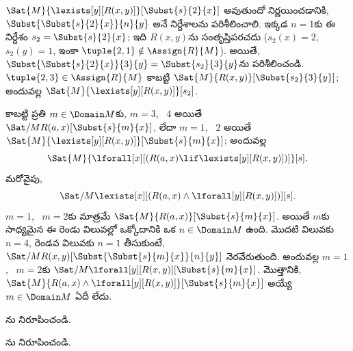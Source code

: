 \documentclass[../../../include/open-logic-section]{subfiles}
\begin{document}
\begin{ex}
$\Sat{M}{\lexists[y][R(x,y)]}[\Subst{s}{2}{x}]$ అవుతుందో
నిర్ణయించడానికి, $\Subst{\Subst{s}{2}{x}}{n}{y}$ అనే 
నిర్దేశాలను పరిశీలించాలి. ఇక్కడ $n = 1$కు ఈ నిర్దేశం
$s_2 = \Subst{s}{2}{x}$; ఇది $R(x,y)$ను సంతృప్తిపరచదు ($s_2(x) = 2$,
$s_2(y) = 1$, ఇంకా $\tuple{2,1}\notin \Assign{R}{M}$). అయితే,
$\Subst{\Subst{s}{2}{x}}{3}{y} = \Subst{s_2}{3}{y}$ను పరిశీలించండి.
$\tuple{2,3} \in \Assign{R}{M}$ కాబట్టి
$\Sat{M}{R(x,y)}[\Subst{s_2}{3}{y}]$; అందువల్ల
$\Sat{M}{\lexists[y][R(x,y)]}[s_2]$.

కాబట్టి ప్రతి $m \in \Domain M$కు,
$m = 3$, ~$4$ అయితే $\Sat/{M}{R(a,x)}[\Subst{s}{m}{x}]$, లేదా
$m = 1$, ~$2$ అయితే $\Sat{M}{\lexists[y][R(x,y)]}[\Subst{s}{m}{x}]$;
అందువల్ల
\[
\Sat{M}{\lforall[x][(R(a,x) \lif \lexists[y][R(x,y)])]}[s].
\]
మరోవైపు,
\[
\Sat/{M}{\lexists[x][(R(a,x) \land \lforall[y][R(x,y)])]}[s].
\]
$m = 1$, ~$m = 2$కు మాత్రమే $\Sat{M}{R(a,x)}[\Subst{s}{m}{x}]$.
అయితే $m$కు సాధ్యమైన ఈ రెండు విలువల్లో ఒక్కోదానికి ఒక
$n \in \Domain M$ ఉంది. మొదటి విలువకు $n = 4$, రెండవ విలువకు $n = 1$ తీసుకుంటే,
$\Sat/{M}{R(x,y)}[\Subst{\Subst{s}{m}{x}}{n}{y}]$ నెరవేరుతుంది. అందువల్ల
$m = 1$, ~$m = 2$కు
$\Sat/{M}{\lforall[y][R(x,y)]}[\Subst{s}{m}{x}]$. మొత్తానికి,
$\Sat{M}{R(a,x) \land \lforall[y][R(x,y)]}[\Subst{s}{m}{x}]$ అయ్యే
$m \in \Domain M$ ఏదీ లేదు.
\end{ex}


\begin{prob}
  ను నిరూపించండి.
\end{prob}
\tagendprob


\begin{prob}
  ను నిరూపించండి.
\end{prob}
\tagendprob
\end{document}
